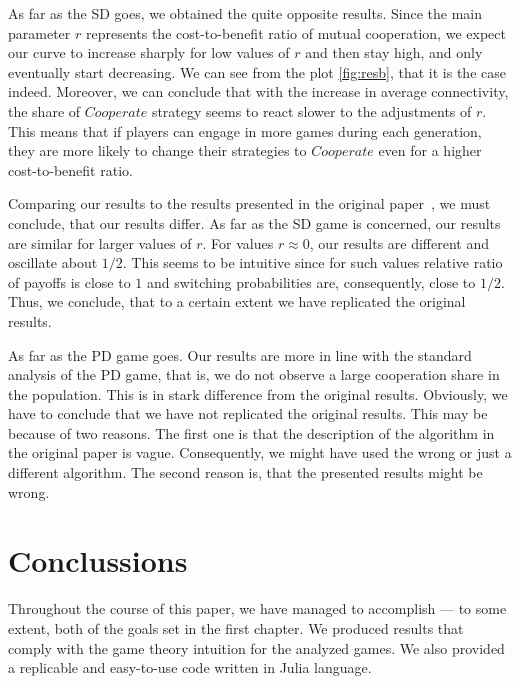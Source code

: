 \documentclass[english, twoside, 12pt, a4paper]{article}
\theoremstyle{definition}
\theoremstyle{plain}
\theoremstyle{remark}
\begin{document}

As far as the SD goes, we obtained the quite opposite results. Since the main parameter $r$ represents the cost-to-benefit ratio of mutual cooperation, we expect our curve to increase sharply for low values of \(r\) and then stay high, and only eventually start decreasing. We can see from the plot \ref{fig:resb}, that it is the case indeed. Moreover, we can conclude that with the increase in average connectivity, the share of $Cooperate$ strategy seems to react slower to the adjustments of $r$. This means that if players can engage in more games during each generation, they are more likely to change their strategies to $Cooperate$ even for a higher cost-to-benefit ratio. 


Comparing our results to the results presented in the original paper~\cite{santos2005scale}, we must conclude, that our results differ. As far as the SD game is concerned, our results are similar for larger values of \(r\). For values \(r\approx 0\), our results are different and oscillate about \(1/2\). This seems to be intuitive since for such values relative ratio of payoffs is close to \(1\) and switching probabilities are, consequently,  close to \(1/2\). Thus, we conclude, that to a certain extent we have replicated the original results. 

As far as the PD game goes. Our results are more in line with the standard analysis of the PD game, that is, we do not observe a large cooperation share in the population. This is in stark difference from the original results. Obviously, we have to conclude that we have not replicated the original results. This may be because of two reasons. The first one is that the description of the algorithm in the original paper is vague. Consequently, we might have used the wrong or just a different algorithm. The second reason is, that the presented results might be wrong. 

\clearpage
\section{Conclussions}


Throughout the course of this paper, we have managed to accomplish --- to some extent, both of the goals set in the first chapter. We produced results that comply with the game theory intuition for the analyzed games. We also provided a replicable and easy-to-use code written in Julia language. 
\end{document}
